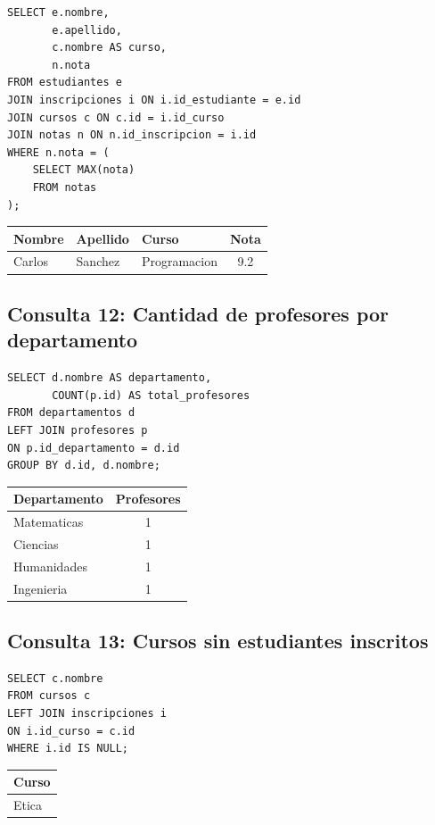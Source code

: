 \documentclass[12pt,a4paper]{article}
\begin{document}
\begin{lstlisting}
SELECT e.nombre,
       e.apellido,
       c.nombre AS curso,
       n.nota
FROM estudiantes e
JOIN inscripciones i ON i.id_estudiante = e.id
JOIN cursos c ON c.id = i.id_curso
JOIN notas n ON n.id_inscripcion = i.id
WHERE n.nota = (
    SELECT MAX(nota)
    FROM notas
);
\end{lstlisting}

\begin{center}
\begin{tabular}{|l|l|l|c|}
\hline
Nombre & Apellido & Curso & Nota \\
\hline
Carlos & Sanchez & Programacion & 9.2 \\
\hline
\end{tabular}
\end{center}


\subsection{Consulta 12: Cantidad de profesores por departamento}

\begin{lstlisting}
SELECT d.nombre AS departamento,
       COUNT(p.id) AS total_profesores
FROM departamentos d
LEFT JOIN profesores p
ON p.id_departamento = d.id
GROUP BY d.id, d.nombre;
\end{lstlisting}

\begin{center}
\begin{tabular}{|l|c|}
\hline
Departamento & Profesores \\
\hline
Matematicas & 1 \\
Ciencias & 1 \\
Humanidades & 1 \\
Ingenieria & 1 \\
\hline
\end{tabular}
\end{center}


\subsection{Consulta 13: Cursos sin estudiantes inscritos}

\begin{lstlisting}
SELECT c.nombre
FROM cursos c
LEFT JOIN inscripciones i
ON i.id_curso = c.id
WHERE i.id IS NULL;
\end{lstlisting}

\begin{center}
\begin{tabular}{|l|}
\hline
Curso \\
\hline
Etica \\
\hline
\end{tabular}
\end{center}
\end{document}

